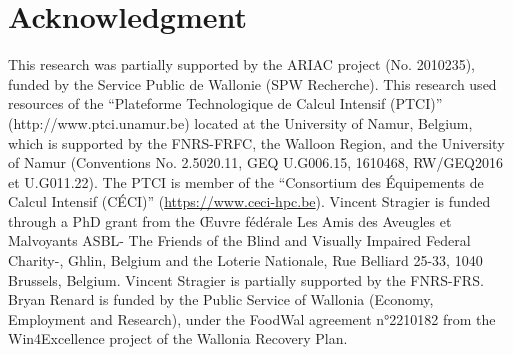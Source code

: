 \documentclass[conference,letterpaper]{IEEEtran}
\begin{document}
\section*{Acknowledgment}
This research was partially supported by the ARIAC project (No. 2010235), funded by the Service Public de Wallonie (SPW Recherche).
This research used resources of the “Plateforme Technologique de Calcul Intensif (PTCI)” (http://www.ptci.unamur.be) located at the University of Namur, Belgium, which is supported  by the FNRS-FRFC, the Walloon Region, and the University of Namur (Conventions No. 2.5020.11, GEQ U.G006.15, 1610468, RW/GEQ2016 et U.G011.22). The PTCI is member of the “Consortium des Équipements de Calcul Intensif  (CÉCI)” (\url{https://www.ceci-hpc.be}).
Vincent Stragier is funded through a PhD grant from the Œuvre fédérale Les Amis des Aveugles et Malvoyants ASBL- The Friends of the Blind and Visually Impaired Federal Charity-, Ghlin, Belgium and the Loterie Nationale, Rue Belliard 25-33, 1040 Brussels, Belgium. Vincent Stragier is partially supported by the FNRS-FRS.
Bryan Renard is funded by the Public Service of Wallonia (Economy, Employment and Research), under the FoodWal agreement n°2210182 from the Win4Excellence project of the Wallonia Recovery Plan.



\end{document}
